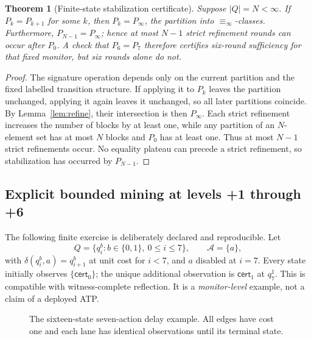 \documentclass[11pt,letterpaper]{article}
\newtheorem{theorem}{Theorem}[section]
\newcommand{\Cert}{\mathsf{cert}}
\newcommand{\ACT}{\mathcal{A}}
\newcommand{\Rinf}{\equiv_{\!\infty}}
\begin{document}
\begin{theorem}[Finite-state stabilization certificate]\label{thm:stabilize}
Suppose $|Q|=N<\infty$. If $P_k=P_{k+1}$ for some $k$, then $P_k=P_\infty$, the partition into $\Rinf$-classes. Furthermore, $P_{N-1}=P_\infty$; hence at most $N-1$ strict refinement rounds can occur after $P_0$. A check that $P_6=P_7$ therefore \emph{certifies} six-round sufficiency for that fixed monitor, but six rounds alone do not.
\end{theorem}
\begin{proof}
The signature operation depends only on the current partition and the fixed labelled transition structure. If applying it to $P_k$ leaves the partition unchanged, applying it again leaves it unchanged, so all later partitions coincide. By Lemma~\ref{lem:refine}, their intersection is then $P_\infty$. Each strict refinement increases the number of blocks by at least one, while any partition of an $N$-element set has at most $N$ blocks and $P_0$ has at least one. Thus at most $N-1$ strict refinements occur. No equality plateau can precede a strict refinement, so stabilization has occurred by $P_{N-1}$.
\end{proof}

\subsection{Explicit bounded mining at levels +1 through +6}
The following finite exercise is deliberately declared and reproducible. Let
\[
Q=\{q_i^b:b\in\{0,1\},\ 0\le i\le 7\},\qquad \ACT=\{a\},
\]
with $\delta(q_i^b,a)=q_{i+1}^b$ at unit cost for $i<7$, and $a$ disabled at $i=7$. Every state initially observes $\{\Cert_0\}$; the unique additional observation is $\Cert_1$ at $q_7^1$. This is compatible with witness-complete reflection. It is a \emph{monitor-level} example, not a claim of a deployed ATP.

\begin{figure}[htbp]\centering
{}
\caption{The sixteen-state seven-action delay example. All edges have cost one and each lane has identical observations until its terminal state.}\label{fig:delay}
\end{figure}
\end{document}
